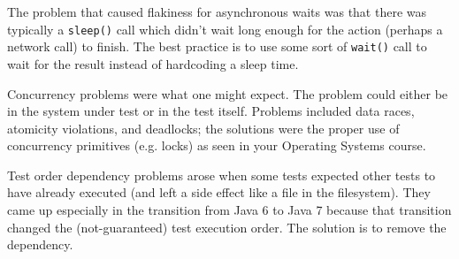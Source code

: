 \documentclass[11pt]{article}
\begin{document}
The problem that caused flakiness for asynchronous waits was that there was typically a
{\tt sleep()} call which didn't wait long enough for the action (perhaps a network call)
to finish. The best practice is to use some sort of {\tt wait()} call to wait for the result
instead of hardcoding a sleep time.

Concurrency problems were what one might expect. The problem could either be in the system under
test or in the test itself. Problems included data races, atomicity violations, and deadlocks;
the solutions were the proper use of concurrency primitives (e.g. locks) as seen in your 
Operating Systems course.

Test order dependency problems arose when some tests expected other tests to have already
executed (and left a side effect like a file in the filesystem). They came up especially 
in the transition from Java 6 to Java 7 because that transition changed the (not-guaranteed)
test execution order. The solution is to remove the dependency.
\end{document}
